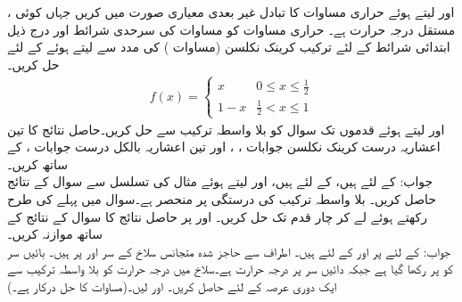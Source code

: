 \quad {} \quad
{}،  اور  لیتے ہوئے حراری مساوات  کا تبادل غیر بعدی معیاری صورت   میں کریں جہاں  کوئی مستقل درجہ حرارت ہے۔
\quad
حراری مساوات  کو مساوات  کی سرحدی شرائط اور درج ذیل ابتدائی شرائط کے لئے ترکیب کرینک نکلسن (مساوات ) کی مدد سے   لیتے ہوئے  کے لئے حل کریں۔
\begin{align*}
f(x)=
\begin{cases}
x& 0\le x\le \tfrac{1}{2}\\
1-x&\tfrac{1}{2}< x\le 1
\end{cases}
\end{align*}
\quad
{} اور  لیتے ہوئے  قدموں تک سوال  کو بلا واسطہ ترکیب سے حل کریں۔حاصل نتائج کا تین اعشاریہ درست کرینک نکلسن جوابات ، ، اور تین اعشاریہ بالکل درست جوابات ،  کے ساتھ کریں۔\\
جواب:\quad
{} کے لئے  ہیں،  کے لئے  ہیں، 
\quad
{} اور  لیتے ہوئے  مثال  کی تسلسل سے سوال  کے نتائج حاصل کریں۔
\quad
بلا واسطہ ترکیب کی درستگی  پر منحصر ہے۔سوال  میں پہلے کی طرح  رکھتے ہوئے   لے کر چار قدم تک حل کریں۔ اور  پر حاصل نتائج کا سوال  کے نتائج کے ساتھ موازنہ کریں۔ \\
جواب:\quad
{} کے لئے  پر  اور
  کے لئے  ہیں۔
\quad
اطراف سے حاجز شدہ متجانس سلاخ کے سر  اور   پر ہیں۔ بائیں سر کو  پر رکھا گیا ہے  جبکہ  دائیں سر  پر درجہ حرارت  ہے۔سلاخ میں درجہ حرارت کو بلا واسطہ ترکیب سے ایک دوری عرصہ  کے لئے حاصل کریں۔ اور  لیں۔(مساوات  کا حل درکار ہے۔)
